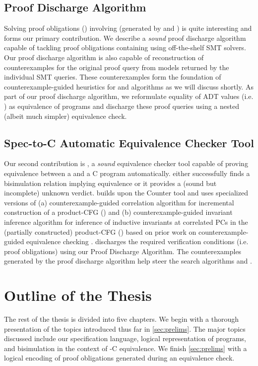 \subsection*{Proof Discharge Algorithm}
Solving proof obligations () involving \recursiveRelations{}
(generated by  and ) is quite interesting and forms our primary contribution.
We describe a {\em sound} proof discharge algorithm capable of tackling proof obligations containing
\recursiveRelations{} using off-the-shelf SMT solvers. Our proof discharge algorithm is also capable of
reconstruction of counterexamples for the original proof query from models returned by the individual SMT queries.
These counterexamples form the foundation of counterexample-guided heuristics for  and  algorithms
as we will discuss shortly.
As part of our proof discharge algorithm,
we reformulate equality of ADT values (i.e. \recursiveRelations{}) as equivalence of programs
and discharge these proof queries using a nested (albeit much simpler) equivalence check.

\subsection*{Spec-to-C Automatic Equivalence Checker Tool}
Our second contribution is \toolName{}, a {\em sound} equivalence checker tool
capable of proving equivalence between a \SpecL{} and a C program automatically.
\toolName{} either successfully finds a bisimulation relation implying equivalence or it provides a (sound but incomplete) unknown verdict.
\toolName{} builds upon the Counter tool\cite{oopsla20} and uses specialized versions of (a) counterexample-guided correlation algorithm for
incremental construction of a product-CFG () and (b) counterexample-guided invariant inference algorithm
for inference of inductive invariants at correlated PCs in the (partially constructed) product-CFG ()
based on prior work on counterexample-guided equivalence checking \cite{shubhanipdhthesis}.
\toolName{} discharges the required verification conditions (i.e. proof obligations) using our Proof Discharge Algorithm.
The counterexamples generated by the proof discharge algorithm help steer the search algorithms  and .

\section{Outline of the Thesis}
\label{sec:outline}
The rest of the thesis is divided into five chapters.
We begin with a thorough presentation of the topics introduced thus far in \cref{sec:prelims}.
The major topics discussed include our specification language, logical representation of programs, and bisimulation
in the context of \SpecL{}-C equivalence.
We finish \cref{sec:prelims} with a logical encoding of proof obligations generated during an equivalence check.

